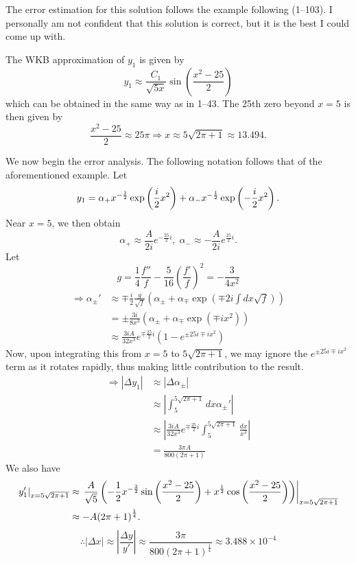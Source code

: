 \item
The error estimation for this solution follows the example following  (1--103).
I personally am not confident that this solution is correct, but it is the best I could come up with.

The WKB approximation of $y_1$ is given by
\[
	y_1 \approx \frac{C_1}{\sqrt{5x}} \sin\left( \frac{x^2 - 25}{2} \right)
\]
which can be obtained in the same way as in  1--43.
The 25th zero beyond $x = 5$ is then given by
\[
	\frac{x^2 - 25}{2} \approx 25\pi
	\Rightarrow x \approx 5 \sqrt{2\pi + 1} \approx 13.494.
\]

We now begin the error analysis.
The following notation follows that of the aforementioned example.
Let
\[
	y_1 = \alpha_+ x^{-\frac{1}{2}} \exp\left( \frac{i}{2} x^2 \right) + \alpha_- x^{-\frac{1}{2}} \exp\left( -\frac{i}{2} x^2 \right).
\]
Near $x = 5$, we then obtain
\[
	\alpha_+ \approx \frac{A}{2i} e^{-\frac{25}{2}i},\; \alpha_- \approx -\frac{A}{2i} e^{\frac{25}{2}i}.
\]
Let
\[
	g = \frac{1}{4}\frac{f''}{f} - \frac{5}{16}{\left( \frac{f'}{f} \right)}^2
	= -\frac{3}{4x^2}
\]
\begin{align*}
	\Rightarrow \alpha_\pm'
	&\approx \mp \frac{i}{2}\frac{g}{\sqrt{f}} \left( \alpha_\pm + \alpha_\mp \exp\left( \mp 2i \int dx \sqrt{f} \right) \right) \\
	&= \pm \frac{3i}{8x^3} \left( \alpha_\pm + \alpha_\mp \exp\left( \mp ix^2 \right) \right) \\
	&\approx \frac{3iA}{32x^3} e^{\mp \frac{25}{2}i} \left( 1 - e^{\pm 25i \mp ix^2} \right)
\end{align*}
Now, upon integrating this from $x = 5$ to $5 \sqrt{2\pi + 1}$, we may ignore the $e^{\pm 25i \mp ix^2}$ term as it rotates rapidly, thus making little contribution to the result.
\begin{align*}
	\Rightarrow \left| \Delta y_1 \right|
	&\approx \left| \Delta \alpha_\pm \right| \\
	&\approx \left| \int_5^{5 \sqrt{2\pi + 1}} dx \alpha_\pm' \right| \\
	&\approx \left| \frac{3iA}{32x^3} e^{\mp \frac{25}{2}i} \int_5^{5 \sqrt{2\pi + 1}} \frac{dx}{x^3} \right| \\
	&= \frac{3\pi A}{800(2\pi + 1)}
\end{align*}
We also have
\begin{align*}
	\left. y_1' \right|_{x = 5 \sqrt{2\pi + 1}}
	&\approx \left. \frac{A}{\sqrt{5}} \left( -\frac{1}{2} x^{-\frac{3}{2}} \sin\left( \frac{x^2 - 25}{2} \right) + x^{\frac{1}{2}} \cos\left( \frac{x^2 - 25}{2} \right) \right) \right|_{x = 5 \sqrt{2\pi + 1}} \\
	&\approx - A {\left( 2\pi + 1 \right)}^{\frac{1}{4}}.
\end{align*}
\[
	\therefore \left| \Delta x \right|
	\approx \left| \frac{\Delta y}{y'} \right|
	\approx \frac{3\pi}{800 {\left( 2\pi + 1 \right)}^{\frac{1}{4}}}
	\approx 3.488 \times 10^{-4}
\]